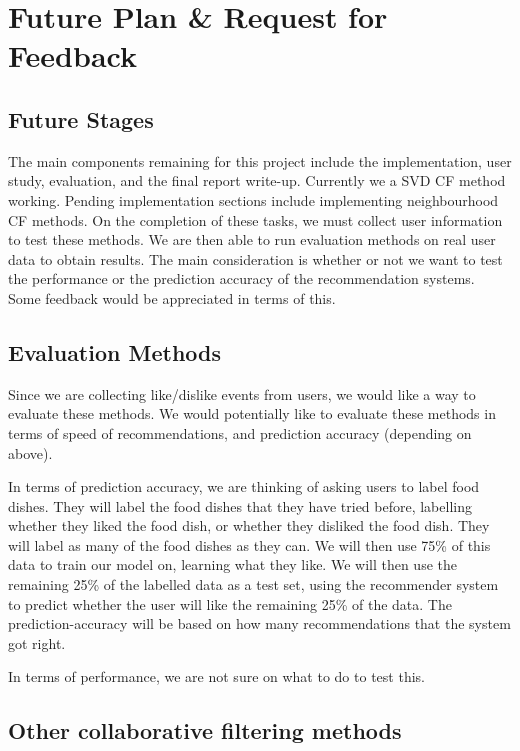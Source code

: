\chapter{Future Plan \& Request for Feedback}\label{C:future}

\section{Future Stages}

The main components remaining for this project include the implementation, user study, evaluation, and the final report write-up. Currently we a SVD CF method working. Pending implementation sections include implementing neighbourhood CF methods. On the completion of these tasks, we must collect user information to test these methods. We are then able to run evaluation methods on real user data to obtain results. The main consideration is whether or not we want to test the performance or the prediction accuracy of the recommendation systems. Some feedback would be appreciated in terms of this.

\section{Evaluation Methods}

Since we are collecting like/dislike events from users, we would like a way to evaluate these methods. We would potentially like to evaluate these methods in terms of speed of recommendations, and prediction accuracy (depending on above). 

In terms of prediction accuracy, we are thinking of asking users to label food dishes. They will label the food dishes that they have tried before, labelling whether they liked the food dish, or whether they disliked the food dish. They will label as many of the food dishes as they can. We will then use 75\% of this data to train our model on, learning what they like. We will then use the remaining 25\% of the labelled data as a test set, using the recommender system to predict whether the user will like the remaining 25\% of the data. The prediction-accuracy will be based on how many recommendations that the system got right. 

In terms of performance, we are not sure on what to do to test this. 

\section{Other collaborative filtering methods}

